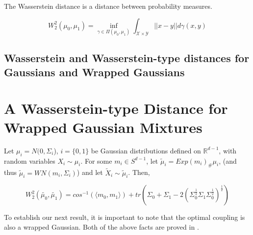 \documentclass[]{article}
\begin{document}
The Wasserstein distance is a distance between probability measures. 

\begin{equation}
	W_2^2(\mu_0, \mu_1) = \inf_{\gamma \in \Pi(\mu_0, \mu_1)} \int_{\mathcal{X}\times\mathcal{Y}} ||x - y|| d\gamma(x,y)
\end{equation}

\subsection{Wasserstein and Wasserstein-type distances for Gaussians and Wrapped Gaussians}

\section{A Wasserstein-type Distance for Wrapped Gaussian Mixtures}\label{section: wrapped gaussian mixture wasserstein-type distance}


Let $\mu_i = N(0,\Sigma_i$), $i = \{0,1\}$ be Gaussian distributions defined on $\mathbb{R}^{d-1}$, with random variables $X_i \sim \mu_i$. For some $m_i \in S^{d-1}$, let $\tilde{\mu}_i = Exp(m_i)_\#\mu_i$, (and thus $\tilde{\mu}_i = WN(m_i, \Sigma_i)$)   and let $\tilde{X}_i \sim \tilde{\mu}_i$. Then, 


\begin{equation*}
	W_2^2(\tilde{\mu_0},\tilde{\mu_1}) = cos^{-1}( \langle m_0, m_1 \rangle ) + tr(\Sigma_0 + \Sigma_1 - 2(\Sigma_0^{\frac{1}{2}}\Sigma_1\Sigma_0^{\frac{1}{2}})^{\frac{1}{2}})
\end{equation*} 

To establish our next result, it is important to note that the optimal coupling is also a wrapped Gaussian. Both of the above facts are proved in \cite{WGOT}.
\end{document}
